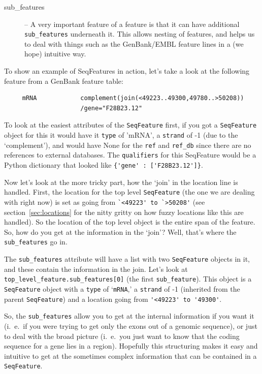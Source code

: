 \documentclass{report}
\begin{document}
\begin{description}
  \item[sub\_features] -- A very important feature of a feature is that it can have additional \verb|sub_features| underneath it. This allows nesting of features, and helps us to deal with things such as the GenBank/EMBL feature lines in a (we hope) intuitive way.
  
\end{description}

To show an example of SeqFeatures in action, let's take a look at the following feature from a GenBank feature table:

\begin{verbatim}
     mRNA            complement(join(<49223..49300,49780..>50208))
                     /gene="F28B23.12"
\end{verbatim}

To look at the easiest attributes of the \verb|SeqFeature| first, if you got a \verb|SeqFeature| object for this it would have it \verb|type| of 'mRNA', a \verb|strand| of -1 (due to the `complement'), and would have None for the \verb|ref| and \verb|ref_db| since there are no references to external databases. The \verb|qualifiers| for this SeqFeature would be a Python dictionary that looked like \verb|{'gene' : ['F28B23.12']}|.

Now let's look at the more tricky part, how the `join' in the location
line is handled. First, the location for the top level \verb|SeqFeature| (the
one we are dealing with right now) is set as going from
\verb|`<49223' to `>50208'| (see section~\ref{sec:locations} for
the nitty gritty on how fuzzy locations like this are handled).
So the location of the top level object is the entire span of the
feature. So, how do you get at the information in the `join'?
Well, that's where the \verb|sub_features| go in.

The \verb|sub_features| attribute will have a list with two \verb|SeqFeature|
objects in it, and these contain the information in the join. Let's
look at \verb|top_level_feature.sub_features[0]| (the first
\verb|sub_feature|). This object is a \verb|SeqFeature| object with a
\verb|type| of `\verb|mRNA|,' a \verb|strand| of -1 (inherited
from the parent \verb|SeqFeature|) and a location going from
\verb|'<49223' to '49300'|.

So, the \verb|sub_features| allow you to get at the internal information if you want it (i.~e.~if you were trying to get only the exons out of a genomic sequence), or just to deal with the broad picture (i.~e.~you just want to know that the coding sequence for a gene lies in a region). Hopefully this structuring makes it easy and intuitive to get at the sometimes complex information that can be contained in a \verb|SeqFeature|.
\end{document}
